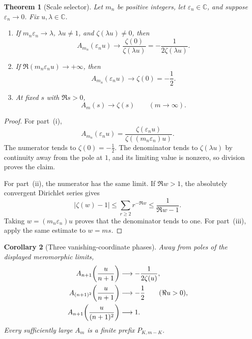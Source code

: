 \documentclass[11pt]{article}
\newtheorem{theorem}{Theorem}[section]
\newtheorem{corollary}[theorem]{Corollary}
\theoremstyle{definition}
\theoremstyle{remark}
\newcommand{\C}{\mathbb C}
\begin{document}
\begin{theorem}[Scale selector]\label{thm:scale-selector}
Let \(m_n\) be positive integers, let \(\varepsilon_n\in\C\), and suppose
\(\varepsilon_n\to0\).  Fix \(u,\lambda\in\C\).
\begin{enumerate}[label=\textup{(\roman*)}]
\item If \(m_n\varepsilon_n\to\lambda\), \(\lambda u\ne1\), and
\(\zeta(\lambda u)\ne0\), then
\begin{equation}
 A_{m_n}(\varepsilon_nu)
 \longrightarrow
 \frac{\zeta(0)}{\zeta(\lambda u)}
 =-\frac1{2\zeta(\lambda u)}.
 \label{eq:scale-selector-theorem}
\end{equation}
\item If
\(\Re(m_n\varepsilon_nu)\to+\infty\), then
\[
 A_{m_n}(\varepsilon_nu)\longrightarrow\zeta(0)=-\frac12.
 \tag{7.4}
\]
\item At fixed \(s\) with \(\Re s>0\),
\[
 A_m(s)\longrightarrow\zeta(s)\qquad(m\to\infty).
 \tag{7.5}
\]
\end{enumerate}
\end{theorem}

\begin{proof}
For part~\textup{(i)},
\[
 A_{m_n}(\varepsilon_nu)
 =\frac{\zeta(\varepsilon_nu)}
        {\zeta((m_n\varepsilon_n)u)}.
 \tag{7.6}
\]
The numerator tends to \(\zeta(0)=-\tfrac12\).  The denominator tends to
\(\zeta(\lambda u)\) by continuity away from the pole at \(1\), and its limiting value is
nonzero, so division proves the claim.

For part~\textup{(ii)}, the numerator has the same limit.  If
\(\Re w>1\), the absolutely convergent Dirichlet series gives
\[
 |\zeta(w)-1|
 \leq\sum_{r\geq2}r^{-\Re w}
 \leq\frac1{\Re w-1}.
 \tag{7.7}
\]
Taking \(w=(m_n\varepsilon_n)u\) proves that the denominator tends to one.
For part~\textup{(iii)}, apply the same estimate to \(w=ms\).
\end{proof}

\begin{corollary}[Three vanishing-coordinate phases]\label{cor:three-phases}
Away from poles of the displayed meromorphic limits,
\begin{align}
 A_{n+1}\!\left(\frac{u}{n+1}\right)
 &\longrightarrow-\frac1{2\zeta(u)},\notag\\
 A_{(n+1)^2}\!\left(\frac{u}{n+1}\right)
 &\longrightarrow-\frac12\qquad(\Re u>0),\notag\\
 A_{n+1}\!\left(\frac{u}{(n+1)^2}\right)
 &\longrightarrow1.
 \label{eq:canonical-scale-witnesses}
\end{align}
Every sufficiently large \(A_m\) is a finite prefix \(P_{K,m-K}\).
\end{corollary}
\end{document}
